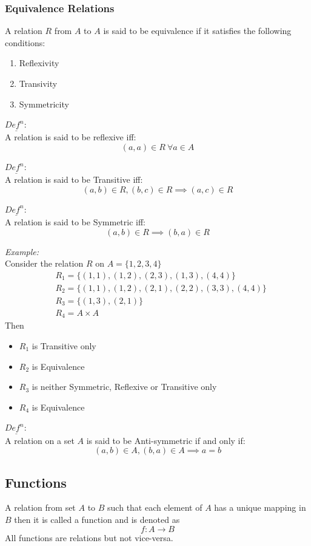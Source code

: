 \documentclass[11pt,letterpaper]{article}
\newenvironment{example}                             
        {\textit{Example:}\\}
	{}
\newenvironment{definition}
	{\begin{mdframed}$\underline{\textit{Def}^\textit{n}:} $\\}
	{\end{mdframed}}
\begin{document}
\subsubsection{Equivalence Relations}
A relation $R$ from $A$ to $A$ is said to be equivalence if it satisfies the following conditions:
\begin{enumerate}
  \item Reflexivity
  \item Transivity
  \item Symmetricity
\end{enumerate}

\begin{definition}
  A relation is said to be reflexive iff:
  \[
    (a,a) \in R \ \forall a \in A
  \]
\end{definition}
\begin{definition}
  A relation is said to be Transitive iff:
  \[
    (a,b) \in R, (b,c) \in R \implies (a,c) \in R
  \]
\end{definition}
\begin{definition}
  A relation is said to be Symmetric iff:
  \[
    (a,b) \in R  \implies (b,a) \in R
  \]
\end{definition}
\begin{example}
  Consider the relation $R$ on $A = \{1,2,3,4\}$\\
  \begin{align*}
    &R_1 = \{(1,1), (1,2), (2,3), (1,3), (4,4)\}\\
    &R_2 = \{(1,1), (1,2), (2,1), (2,2), (3,3), (4,4)\}\\
    &R_3 = \{(1,3), (2,1)\}\\
    &R_4 = A \times A
  \end{align*}
  Then 
  \begin{itemize}
    \item $R_1$ is Transitive only
    \item $R_2$ is Equivalence
    \item $R_3$ is neither Symmetric, Reflexive or Transitive only
    \item $R_4$ is Equivalence
  \end{itemize}
\end{example}
\begin{definition}
  A relation on a set $A$ is said to be Anti-symmetric if and only if:
  \[
    (a,b) \in A, (b,a) \in A \implies a = b
  \]
\end{definition}
\subsection{Functions}
A relation from set $A$ to $B$ such that each element of $A$ has a unique mapping in $B$ then it is called a function and is denoted as 
\[
  f: A \rightarrow B
\]
All functions are relations but not vice-versa. 
\end{document}
